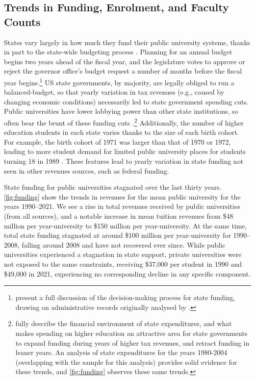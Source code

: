 \subsection{Trends in Funding, Enrolment, and Faculty Counts}
\label{sec:trends}

States vary largely in how much they fund their public university systems, thanks in part to the state-wide budgeting process \citep{NBERw23736}.
Planning for an annual budget begins two years ahead of the fiscal year, and the legislature votes to approve or reject the governor office's budget request a number of months before the fiscal year begins.\footnote{
    \cite{NBERw23736} present a full discussion of the decision-making process for state funding, drawing on administrative records originally analysed by \cite{parmley2009state}.
}
US state governments, by majority, are legally obliged to run a balanced-budget, so that yearly variation in tax revenues (e.g., caused by changing economic conditions) necessarily led to state government spending cuts.
Public universities have lower lobbying power than other state institutions, so often bear the brunt of these funding cuts \citep{delaney2011state}.\footnote{
    \cite{delaney2011state} fully describe the financial environment of state expenditures, and what makes spending on higher education an attractive area for state governments to expand funding during years of higher tax revenues, and retract funding in leaner years.
    An analysis of state expenditures for the years 1980-2004 (overlapping with the sample for this analysis) provides solid evidence for these trends, and \autoref{fig:funding} observes these same trends.
}
Additionally, the number of higher education students in each state varies thanks to the size of each birth cohort.
For example, the birth cohort of 1971 was larger than that of 1970 or 1972, leading to more student demand for limited public university places for students turning 18 in 1989 \citep{bound2007cohort}.
These features lead to yearly variation in state funding not seen in other revenues sources, such as federal funding.

State funding for public universities stagnated over the last thirty years.
\autoref{fig:funding} show the trends in revenues for the mean public university for the years 1990--2021.
We see a rise in total revenues received by public universities (from all sources), and a notable increase in mean tuition revenues from \$48 million per year-university to \$150 million per year-university.
At the same time, total state funding stagnated at around \$100 million per year-university for 1990--2008, falling around 2008 and have not recovered ever since.
While public universities experienced a stagnation in state support, private universities were not exposed to the same constraints, receiving \$37,000 per student in 1990 and \$49,000 in 2021, experiencing no corresponding decline in any specific component.

